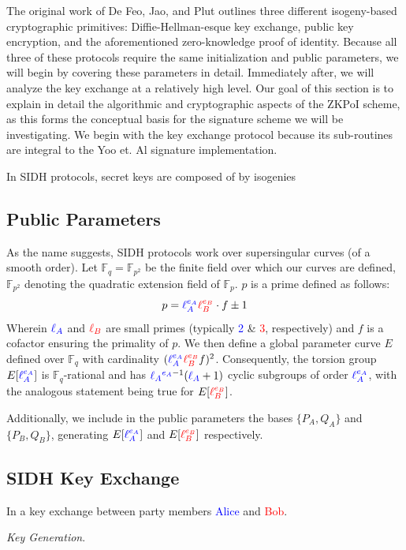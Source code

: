 The original work of De Feo, Jao, and Plut outlines three different isogeny-based cryptographic primitives: Diffie-Hellman-esque key exchange, public key encryption, and the aforementioned zero-knowledge proof of identity. Because all three of these protocols require the same initialization and public parameters, we will begin by covering these parameters in detail. Immediately after, we will analyze the key exchange at a relatively high level. Our goal of this section is to explain in detail the algorithmic and cryptographic aspects of the ZKPoI scheme, as this forms the conceptual basis for the signature scheme we will be investigating. We begin with the key exchange protocol because its sub-routines are integral to the Yoo et. Al signature implementation.

In SIDH protocols, secret keys are composed of by isogenies 

\subsection{Public Parameters}

As the name suggests, SIDH protocols work over supersingular curves (of a smooth order). Let $\mathbb{F}_q = \mathbb{F}_{p^2}$ be the finite field over which our curves are defined, $\mathbb{F}_{p^2}$ denoting the quadratic extension field of $\mathbb{F}_{p}$.  $p$ is a prime defined as follows:
$$
p = \textcolor{blue}{\ell_{A}^{e_A}} \textcolor{red}{\ell_{B}^{e_B}} \cdot f \pm 1
$$
Wherein $\textcolor{blue}{\ell_{A}}$ and $\textcolor{red}{\ell_{B}}$ are small primes (typically \textcolor{blue}{2} \& \textcolor{red}{3}, respectively) and $f$ is a cofactor ensuring the primality of $p$. We then define a global parameter curve $E$ defined over $\mathbb{F}_q$ with cardinality $(\textcolor{blue}{\ell_{A}^{e_A}} \textcolor{red}{\ell_{B}^{e_B}} f)^2$. Consequently, the torsion group $E[\textcolor{blue}{\ell_{A}^{e_A}}]$ is $\mathbb{F}_q$-rational and has $\textcolor{blue}{\ell_{A}}^{\textcolor{blue}{e_A} - 1} (\textcolor{blue}{\ell_{A}} + 1)$ cyclic subgroups of order $\textcolor{blue}{\ell_{A}^{e_A}}$, with the analogous statement being true for $E[\textcolor{red}{\ell_{B}^{e_B}}]$.

Additionally, we include in the public parameters the bases $\{P_A,Q_A\}$ and $\{P_B,Q_B\}$, generating $E[\textcolor{blue}{\ell_{A}^{e_A}}]$ and $E[\textcolor{red}{\ell_{B}^{e_B}}]$ respectively.\\

\subsection{SIDH Key Exchange}

In a key exchange between party members \textcolor{blue}{Alice} and \textcolor{red}{Bob}.

\noindent
\textit{Key Generation}.

